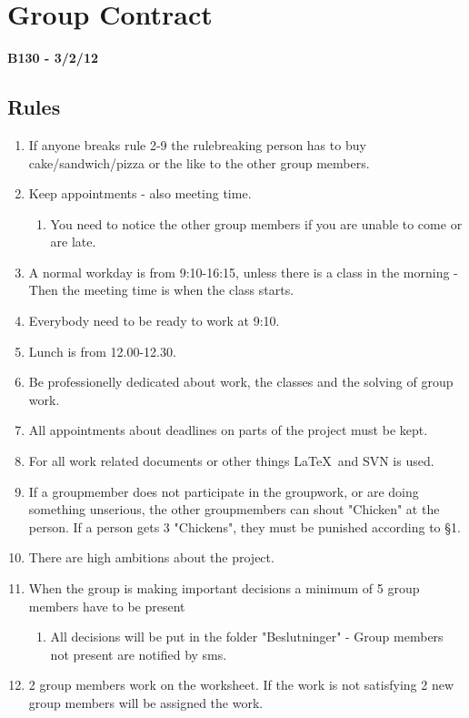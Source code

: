 \chapter{Group Contract}
\label{chap:groupcontract}
\textbf{B130 - 3/2/12}
\section*{Rules}
\renewcommand{\labelenumi}{§ \arabic{enumi}}
\renewcommand{\labelenumii}{\alph{enumii}}
\begin{enumerate}
\item If anyone breaks rule 2-9 the rulebreaking person has to buy cake/sandwich/pizza or the like to the other group members.
\item Keep appointments - also meeting time. 
	\begin{enumerate}
	\item You need to notice the other group members if you are unable to come or are late.
	\end{enumerate}
\item A normal workday is from 9:10-16:15, unless there is a class in the morning - Then the meeting time is when the class starts.
\item Everybody need to be ready to work at 9:10.
\item Lunch is from 12.00-12.30.
\item Be professionelly dedicated about work, the classes and the solving of group work.
\item All appointments about deadlines on parts of the project must be kept.
\item For all work related documents or other things \LaTeX~and SVN is used.
\item If a groupmember does not participate in the groupwork, or are doing something unserious, the other groupmembers can shout "Chicken" at the person. If a person gets 3 "Chickens", they must be punished according to §1.
\item There are high ambitions about the project.
\item When the group is making important decisions a minimum of 5 group members have to be present 
	\begin{enumerate}
	\item All decisions will be put in the folder "Beslutninger" - Group members not present are notified by sms.
	\end{enumerate}
\item 2 group members work on the worksheet.  If the work is not satisfying 2 new group members will be assigned the work.

\end{enumerate}
